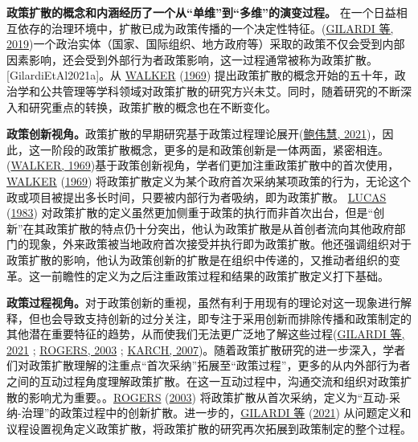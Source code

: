 \documentclass[
  12pt,
]{ctexart}
\begin{document}
\textbf{政策扩散的概念和内涵经历了一个从``单维''到``多维''的演变过程。}
在一个日益相互依存的治理环境中，扩散已成为政策传播的一个决定性特征。(\protect\hyperlink{ref-GilardiWasserfallen2019}{GILARDI 等, 2019})一个政治实体（国家、国际组织、地方政府等）采取的政策不仅会受到内部因素影响，还会受到外部行为者政策影响，这一过程通常被称为政策扩散。{[}GilardiEtAl2021a{]}。从 \protect\hyperlink{ref-Walker1969}{WALKER} (\protect\hyperlink{ref-Walker1969}{1969}) 提出政策扩散的概念开始的五十年，政治学和公共管理等学科领域对政策扩散的研究方兴未艾。同时，随着研究的不断深入和研究重点的转换，政策扩散的概念也在不断变化。

\textbf{政策创新视角。}政策扩散的早期研究基于政策过程理论展开(\protect\hyperlink{ref-BaoWeiHui2021}{鲍伟慧, 2021})，因此，这一阶段的政策扩散概念，更多的是和政策创新是一体两面，紧密相连。(\protect\hyperlink{ref-Walker1969}{WALKER, 1969})基于政策创新视角，学者们更加注重政策扩散中的首次使用， \protect\hyperlink{ref-Walker1969}{WALKER} (\protect\hyperlink{ref-Walker1969}{1969}) 将政策扩散定义为某个政府首次采纳某项政策的行为，无论这个政或项目被提出多长时间，只要被内部行为者吸纳，即为政策扩散。 \protect\hyperlink{ref-Lucas1983}{LUCAS} (\protect\hyperlink{ref-Lucas1983}{1983}) 对政策扩散的定义虽然更加侧重于政策的执行而非首次出台，但是``创新''在其政策扩散的特点仍十分突出，他认为政策扩散是从首创者流向其他政府部门的现象，外来政策被当地政府首次接受并执行即为政策扩散。他还强调组织对于政策扩散的影响，他认为政策创新的扩散是在组织中传递的，又推动者组织的变革。这一前瞻性的定义为之后注重政策过程和结果的政策扩散定义打下基础。

\textbf{政策过程视角。}对于政策创新的重视，虽然有利于用现有的理论对这一现象进行解释，但也会导致支持创新的过分关注，即专注于采用创新而排除传播和政策制定的其他潜在重要特征的趋势，从而使我们无法更广泛地了解这些过程(\protect\hyperlink{ref-GilardiEtAl2021}{GILARDI 等, 2021} ; \protect\hyperlink{ref-Rogers2003}{ROGERS, 2003} ; \protect\hyperlink{ref-Karch2007}{KARCH, 2007})。随着政策扩散研究的进一步深入，学者们对政策扩散理解的注重点``首次采纳''拓展至``政策过程''，更多的从内外部行为者之间的互动过程角度理解政策扩散。在这一互动过程中，沟通交流和组织对政策扩散的影响尤为重要。。\protect\hyperlink{ref-Rogers2003}{ROGERS} (\protect\hyperlink{ref-Rogers2003}{2003}) 将政策扩散从首次采纳，定义为``互动-采纳-治理''的政策过程中的创新扩散。进一步的，\protect\hyperlink{ref-GilardiEtAl2021}{GILARDI 等} (\protect\hyperlink{ref-GilardiEtAl2021}{2021}) 从问题定义和议程设置视角定义政策扩散，将政策扩散的研究再次拓展到政策制定的整个过程。
\end{document}
